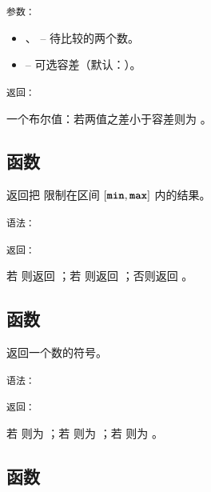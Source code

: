 \begin{center}
\end{center}

\medskip
\texttt{参数： }

\begin{itemize}
\item {}、 – 待比较的两个数。
\item {} – 可选容差（默认：）。
\end{itemize}

\medskip
\texttt{返回： }

一个布尔值：若两值之差小于容差则为 。



\subsection{函数 }
\label{sub:function_utils_clamp}

返回把  限制在区间 $[\code{min}, \code{max}]$ 内的结果。

\medskip
\texttt{语法： }

\begin{center}
\end{center}

\medskip
\texttt{返回： }

若  则返回 ；若  则返回 ；否则返回 。

\subsection{函数 }
\label{sub:function_utils_sign}

返回一个数的符号。

\medskip
\texttt{语法： }

\begin{center}
\end{center}

\medskip
\texttt{返回： }

若  则为 ；若  则为 ；若  则为 。

\subsection{函数 }
\label{sub:function_utils_w}

